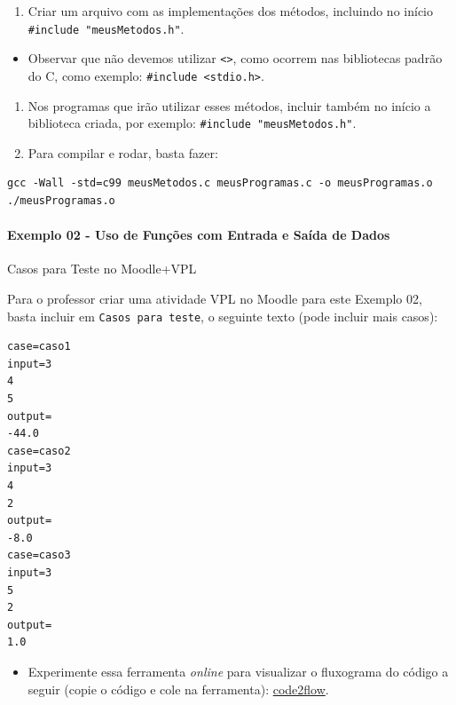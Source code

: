 \documentclass[12pt,a4paper]{article}
\providecommand{\tightlist}{%
      \setlength{\itemsep}{0pt}\setlength{\parskip}{0pt}}
\begin{document}
\begin{enumerate}
\def\labelenumi{\arabic{enumi}.}
\setcounter{enumi}{1}
\tightlist
\item
  Criar um arquivo com as implementações dos métodos, incluindo no
  início \texttt{\#include\ "meusMetodos.h"}.
\end{enumerate}

\begin{itemize}
\tightlist
\item
  Observar que não devemos utilizar \texttt{\textless{}\textgreater{}},
  como ocorrem nas bibliotecas padrão do C, como exemplo:
  \texttt{\#include\ \textless{}stdio.h\textgreater{}}.
\end{itemize}

\begin{enumerate}
\def\labelenumi{\arabic{enumi}.}
\setcounter{enumi}{2}
\tightlist
\item
  Nos programas que irão utilizar esses métodos, incluir também no
  início a biblioteca criada, por exemplo:
  \texttt{\#include\ "meusMetodos.h"}.
\item
  Para compilar e rodar, basta fazer:
\end{enumerate}

\begin{verbatim}
gcc -Wall -std=c99 meusMetodos.c meusProgramas.c -o meusProgramas.o
./meusProgramas.o
\end{verbatim}

    \hypertarget{exemplo-02---uso-de-funuxe7uxf5es-com-entrada-e-sauxedda-de-dados}{%
\paragraph{Exemplo 02 - Uso de Funções com Entrada e Saída de
Dados}\label{exemplo-02---uso-de-funuxe7uxf5es-com-entrada-e-sauxedda-de-dados}}

    Casos para Teste no Moodle+VPL

Para o professor criar uma atividade VPL no Moodle para este Exemplo 02,
basta incluir em \texttt{Casos\ para\ teste}, o seguinte texto (pode
incluir mais casos):

\begin{verbatim}
case=caso1
input=3
4
5
output= 
-44.0
case=caso2
input=3
4
2
output= 
-8.0
case=caso3
input=3
5
2
output= 
1.0
\end{verbatim}

    \begin{itemize}
\tightlist
\item
  Experimente essa ferramenta \emph{online} para visualizar o fluxograma
  do código a seguir (copie o código e cole na ferramenta):
  \href{https://app.code2flow.com/}{code2flow}.
\end{itemize}
\end{document}
